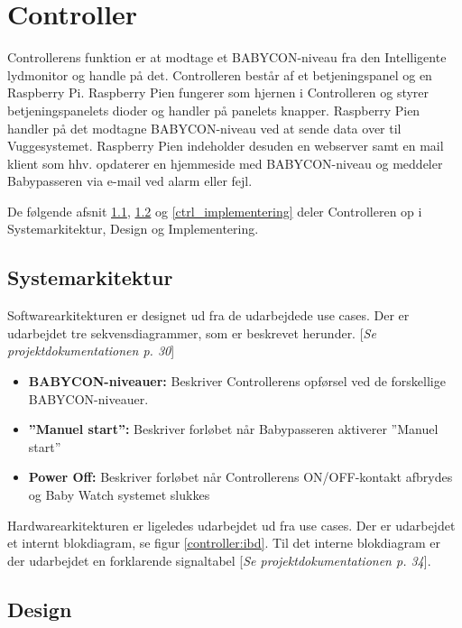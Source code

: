 \chapter{Controller}

Controllerens funktion er at modtage et BABYCON-niveau fra den Intelligente lydmonitor og handle på det. Controlleren består af et betjeningspanel og en Raspberry Pi. Raspberry Pien fungerer som hjernen i Controlleren og styrer betjeningspanelets dioder og handler på panelets knapper. Raspberry Pien handler på det modtagne BABYCON-niveau ved at sende data over \iic til Vuggesystemet. Raspberry Pien indeholder desuden en webserver samt en mail klient som hhv. opdaterer en hjemmeside med BABYCON-niveau og meddeler Babypasseren via e-mail ved alarm eller fejl.

De følgende afsnit \ref{ctrl_sysark}, \ref{ctrl_design} og \ref{ctrl_implementering} deler Controlleren op i Systemarkitektur, Design og Implementering.

\section{Systemarkitektur}
\label{ctrl_sysark}

Softwarearkitekturen er designet ud fra de udarbejdede use cases. Der er udarbejdet tre sekvensdiagrammer, som er beskrevet herunder. [\textit{Se projektdokumentationen p. 30}]

\begin{itemize}
\item \textbf{BABYCON-niveauer:} Beskriver Controllerens opførsel ved de forskellige BABYCON-niveauer.
\item \textbf{''Manuel start'':} Beskriver forløbet når Babypasseren aktiverer ''Manuel start''
\item \textbf{Power Off:} Beskriver forløbet når Controllerens ON/OFF-kontakt afbrydes og Baby Watch systemet slukkes 
\end{itemize}

Hardwarearkitekturen er ligeledes udarbejdet ud fra use cases. Der er udarbejdet et internt blokdiagram, se figur \ref{controller:ibd}. Til det interne blokdiagram er der udarbejdet en forklarende signaltabel [\textit{Se projektdokumentationen p. 34}].



\section{Design}
\label{ctrl_design}

